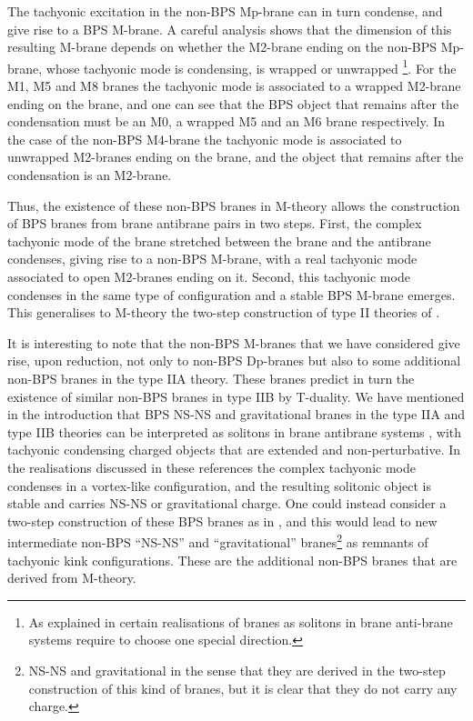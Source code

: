 \documentclass[12pt,a4paper]{article}
\begin{document}
The tachyonic excitation in the non-BPS Mp-brane can in turn
condense, and give rise to a BPS M-brane. A careful analysis shows
that the dimension of this resulting M-brane  
depends on whether the M2-brane ending on the non-BPS Mp-brane,
whose tachyonic mode is condensing, is wrapped or unwrapped 
\footnote{ As explained in \cite{HL1} certain realisations of branes
as solitons in brane anti-brane systems require to choose one
special direction.}. 
For the M1, M5 and M8 branes
the tachyonic mode is associated to a wrapped M2-brane ending on the
brane, and one can see that the BPS object that remains after the
condensation must be an M0, a wrapped M5 and an M6 brane respectively. 
In the case of the non-BPS M4-brane the tachyonic mode is associated
to unwrapped M2-branes ending on the brane, and the object that remains after
the condensation is an M2-brane.
 
Thus, the existence of these non-BPS branes in 
M-theory allows the construction of
BPS branes from brane antibrane pairs in two steps. First, the complex
tachyonic mode of the brane stretched between the brane and the antibrane
condenses, giving rise to a non-BPS M-brane, with a real tachyonic mode
associated to open M2-branes ending on it. Second, this tachyonic mode
condenses in the same type of configuration and a stable BPS M-brane 
emerges. This generalises to M-theory the two-step construction of type II 
theories of \cite{Sen1,Sen3}. 

It is interesting to note that the non-BPS M-branes that we have
considered give rise, upon reduction, not only to non-BPS 
Dp-branes but also to some additional non-BPS branes in
the type IIA theory. These branes predict in turn the existence of
similar non-BPS branes in type IIB by T-duality. We have mentioned in the
introduction that
BPS NS-NS and gravitational branes \cite{Hull} in the type IIA and
type IIB theories can be interpreted as solitons in brane antibrane
systems \cite{Yi, HL1}, with tachyonic condensing charged
objects that are extended and non-perturbative. In the realisations 
discussed in these references the complex tachyonic
mode condenses in a vortex-like configuration, and the resulting 
solitonic object is stable and carries NS-NS or gravitational charge.
One could instead consider a two-step construction of these BPS branes
as in \cite{Sen1,Sen3}, and this would lead to new 
intermediate non-BPS ``NS-NS'' and ``gravitational''
branes\footnote{NS-NS and gravitational in the sense that they are
derived in the two-step construction of this kind of branes, but
it is clear that they do not carry any charge.} 
as remnants of tachyonic kink configurations. These are the 
additional non-BPS branes that are derived from M-theory. 
\end{document}
